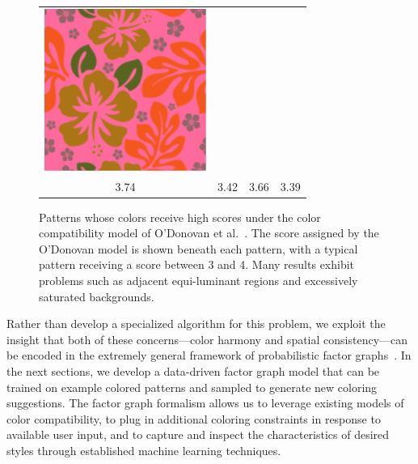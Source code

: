 \begin{figure}[htb]
\begin{tabular}{cccc}
\includegraphics[width=.2\columnwidth]{figs/colorCompat/r_1_3_3-39}\\
3.74&3.42&3.66&3.39\\
\end{tabular}
\caption{Patterns whose colors receive high scores under the color compatibility model of O'Donovan et al.~. The score assigned by the O'Donovan model is shown beneath each pattern, with a typical pattern receiving a score between 3 and 4. Many results exhibit problems such as adjacent equi-luminant regions and excessively saturated backgrounds.}
\label{fig:ColorCompatOnly}
\end{figure}

Rather than develop a specialized algorithm for this problem, we exploit the insight that both of these concerns---color harmony and spatial consistency---can be encoded in the extremely general framework of probabilistic factor graphs~\cite{FactorGraphs}. In the next sections, we develop a data-driven factor graph model that can be trained on example colored patterns and sampled to generate new coloring suggestions. The factor graph formalism allows us to leverage existing models of color compatibility, to plug in additional coloring constraints in response to available user input, and to capture and inspect the characteristics of desired styles through established machine learning techniques.

